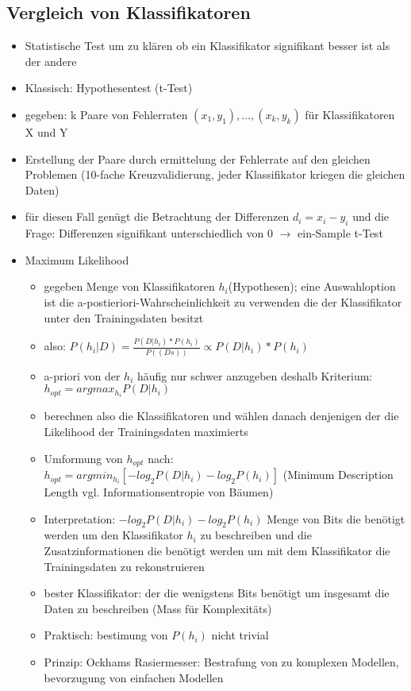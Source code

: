 \documentclass{article} %
\begin{document}
	\subsection{Vergleich von Klassifikatoren}
	\begin{itemize}
		\item Statistische Test um zu klären ob ein Klassifikator signifikant besser ist als der andere
		\item Klassisch: Hypothesentest (t-Test)
		\item gegeben: k Paare von Fehlerraten $(x_1,y_1),\dots,(x_k,y_k)$ für Klassifikatoren X und Y
		\item Erstellung der Paare durch ermittelung der Fehlerrate auf den gleichen Problemen (10-fache Kreuzvalidierung, jeder Klassifikator kriegen die gleichen Daten)
		\item für diesen Fall genügt die Betrachtung der Differenzen $d_i = x_i-y_i$ und die Frage: Differenzen signifikant unterschiedlich von 0 $\rightarrow$ ein-Sample t-Test
		\item Maximum Likelihood
		\begin{itemize}
			\item gegeben Menge von Klassifikatoren $h_i$(Hypothesen); eine Auswahloption ist die a-postieriori-Wahrscheinlichkeit zu verwenden die der Klassifikator unter den Trainingsdaten besitzt
			\item also: $P(h_i|D) = \frac{P(D|h_i)*P(h_i)}{P((Ds))} \propto P(D|h_i)*P(h_i)$
			\item a-priori von der $h_i$ häufig nur schwer anzugeben deshalb Kriterium: $h_{opt} = argmax_{h_i} P(D|h_i)$
			\item berechnen also die Klassifikatoren und wählen danach denjenigen der die Likelihood der Trainingsdaten maximierts
			\item Umformung von $h_{opt}$ nach: $h_{opt} = argmin_{h_i}[-log_2 P(D|h_i)-log_2 P(h_i)]$ (Minimum Description Length vgl. Informationsentropie von Bäumen)
			\item Interpretation: $-log_2 P(D|h_i)-log_2 P(h_i)$ Menge von Bits die benötigt werden um den Klassifikator $h_i$ zu beschreiben und die Zusatzinformationen die benötigt werden um mit dem Klassifikator die Trainingsdaten zu rekonstruieren
			\item bester Klassifikator: der die wenigstens Bits benötigt um insgesamt die Daten zu beschreiben (Mass für Komplexitäts)
			\item Praktisch: bestimung von $P(h_i)$ nicht trivial
			\item Prinzip: Ockhams Rasiermesser: Bestrafung von zu komplexen Modellen, bevorzugung von einfachen Modellen
		\end{itemize}
	\end{itemize}
\end{document}

